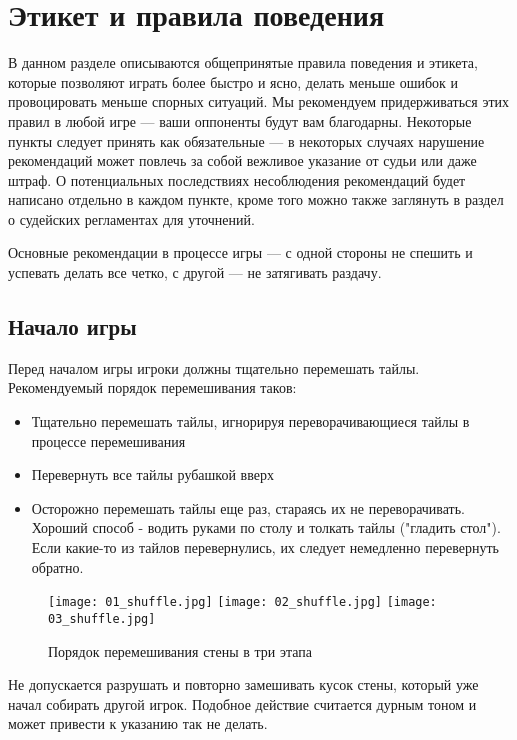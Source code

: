 \section{Этикет и правила поведения}

В данном разделе описываются общепринятые правила поведения и этикета, которые позволяют играть более быстро и ясно, делать меньше ошибок и провоцировать меньше спорных ситуаций. Мы рекомендуем придерживаться этих правил в любой игре --- ваши оппоненты будут вам благодарны. Некоторые пункты следует принять как обязательные --- в некоторых случаях нарушение рекомендаций может повлечь за собой вежливое указание от судьи или даже штраф. О потенциальных последствиях несоблюдения рекомендаций будет написано отдельно в каждом пункте, кроме того можно также заглянуть в раздел о судейских регламентах для уточнений.

Основные рекомендации в процессе игры --- с одной стороны не спешить и успевать делать все четко, с другой --- не затягивать раздачу. 

\subsection {Начало игры}

Перед началом игры игроки должны тщательно перемешать тайлы. Рекомендуемый порядок перемешивания таков:

\begin{itemize}
	\item Тщательно перемешать тайлы, игнорируя переворачивающиеся тайлы в процессе перемешивания
	\item Перевернуть все тайлы рубашкой вверх
	\item Осторожно перемешать тайлы еще раз, стараясь их не переворачивать. Хороший способ - водить руками по столу и толкать тайлы ("гладить стол"). Если какие-то из тайлов перевернулись, их следует немедленно перевернуть обратно.
\end{itemize}

\begin{figure}[H]
	\centering
	\texttt{[image: 01\_shuffle.jpg]}
	\texttt{[image: 02\_shuffle.jpg]}
	\texttt{[image: 03\_shuffle.jpg]}
	\caption{Порядок перемешивания стены в три этапа}
\end{figure}

Не допускается разрушать и повторно замешивать кусок стены, который уже начал собирать другой игрок. Подобное действие считается дурным тоном и может привести к указанию так не делать.

